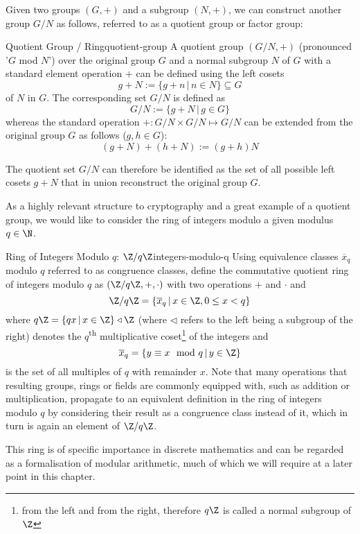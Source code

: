 Given two groups $(G, +)$ and a subgroup $(N, +)$, we can construct another group $G / N$ as follows, referred to as a quotient group or factor group:

\begin{definition}{Quotient Group / Ring}{quotient-group}
  A quotient group $(G / N, +)$ (pronounced '$G$ mod $N$') over the original group $G$ and a normal subgroup $N$ of $G$
  with a standard element operation $+$ can be defined using the left cosets
  $$g+N := \{g+n \,|\, n \in N\} \subseteq G$$ of $N$ in $G$.
  The corresponding set $G / N$ is defined as
  $$G / N := \{g + N \,|\, g \in G\}$$
  whereas the standard operation $+: G/N \times G/N \mapsto G/N$
  can be extended from the original group $G$ as follows ($g, h \in G$):
  $$(g+N) + (h+N) := (g+h)N$$
\end{definition}

The quotient set $G / N$ can therefore be identified as the set of all possible left cosets $g + N$ that in union reconstruct the original group $G$.

As a highly relevant structure to cryptography and a great example of a quotient group, we would like to consider the ring of integers modulo a given modulus $q \in \N$.

\begin{lemma}{Ring of Integers Modulo $q$: $\Z / q \Z$}{integers-modulo-q}
  Using equivalence classes $\overline{x}_q$ modulo $q$ referred to as congruence classes,
  define the commutative quotient ring of integers modulo $q$ as $(\Z / q \Z, +, \cdot)$ with
  two operations $+$ and $\cdot$ and
  $$\Z / q \Z = \{\overline{x}_q \,|\, x \in \Z, 0 \leq x < q\}$$
  where $q \Z = \{q x \,|\, x \in \Z\} \triangleleft \Z$ (where $\triangleleft$ refers to the left being a subgroup of the right) denotes the $q$\textsuperscript{th} multiplicative coset\footnote{
    from the left and from the right, therefore $q \Z$ is called a normal subgroup of $\Z$
  } of the integers and
  $$\overline{x}_q = \{y \equiv x \mod q \,|\, y \in \Z\}$$
  is the set of all multiples of $q$ with remainder $x$.
  Note that many operations that resulting groups, rings or fields are commonly equipped with,
  such as addition or multiplication, propagate to an equivalent definition in the ring of integers modulo $q$
  by considering their result as a congruence class instead of it, which in turn is again an element of $\Z / q \Z$.
\end{lemma}

This ring is of specific importance in discrete mathematics and can be regarded as a formalisation of modular arithmetic, much of which we will require at a later point in this chapter.

